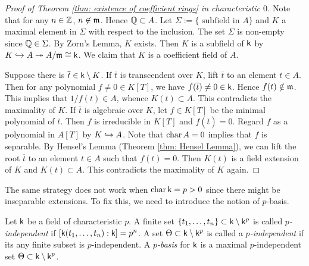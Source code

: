         \begin{proof}[Proof of Theorem \ref{thm: existence of coefficient rings} in characteristic \(0\)]
            Note that for any \(n \in {\mathbb{Z}}\), \(n \not\in {\mathfrak{m}}\).
            Hence \({\mathbb{Q}} \subset A\).
            Let \( \Sigma := \{ \text{ subfield in } A \} \) and \(K\) a maximal element in \(\Sigma\) with respect to the inclusion.
            The set \(\Sigma\) is non-empty since \({\mathbb{Q}} \in \Sigma\). 
            By Zorn's Lemma, \(K\) exists.
            Then \(K\) is a subfield of \({\mathsf{k}}\) by \(K \hookrightarrow A \twoheadrightarrow A/{\mathfrak{m}} \cong {\mathsf{k}}\).
            We claim that \(K\) is a coefficient field of \(A\).

            Suppose there is \(\overline{t} \in {\mathsf{k}} \setminus K\). 
            If \(\overline{t}\) is transcendent over \(K\), lift \(\overline{t}\) to an element \(t \in A\).
            Then for any polynomial \(f \neq 0\in K[T]\), we have \(f(\overline{t}) \neq 0 \in {\mathsf{k}}\).
            Hence \(f(t) \notin {\mathfrak{m}}\).
            This implies that \(1/f(t) \in A\), whence \(K(t) \subset A\).
            This contradicts the maximality of \(K\).
            If \(\overline{t}\) is algebraic over \(K\), let \(f \in K[T]\) be the minimal polynomial of \(\overline{t}\).
            Then \(f\) is irreducible in \(K[T]\) and \(f(\overline{t}) = 0\).
            Regard \(f\) as a polynomial in \(A[T]\) by \(K \hookrightarrow A\).
            Note that \(\operatorname{char} A = 0\) implies that \(f\) is separable.
            By Hensel's Lemma (Theorem \ref{thm: Hensel Lemma}), we can lift the root \(\overline{t}\) to an element \(t \in A\) such that \(f(t) = 0\).
            Then \(K(t)\) is a field extension of \(K\) and \(K(t) \subset A\).
            This contradicts the maximality of \(K\) again.
        \end{proof}

        The same strategy does not work when \(\operatorname{char} {\mathsf{k}} = p > 0\) since there might be inseparable extensions.
        To fix this, we need to introduce the notion of \(p\)-basis.

        \begin{definition}\label{def: p-basis for field of characteristic p}
            Let \({\mathsf{k}}\) be a field of characteristic \(p\).
            A finite set \(\{t_1,\ldots,t_n\} \subset {\mathsf{k}} \setminus {\mathsf{k}}^p\) is called \emph{\(p\)-independent} if \([{\mathsf{k}}(t_1,\ldots,t_n):{\mathsf{k}}]=p^n\).
            A set \(\Theta \subset {\mathsf{k}} \setminus {\mathsf{k}}^p\) is called a \emph{\(p\)-independent} if its any finite subset is \(p\)-independent.
            A \emph{\(p\)-basis} for \({\mathsf{k}}\) is a maximal \(p\)-independent set \(\Theta \subset {\mathsf{k}} \setminus {\mathsf{k}}^p\).
        \end{definition}

